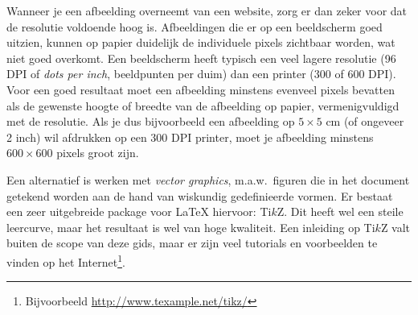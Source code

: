Wanneer je een afbeelding overneemt van een website, zorg er dan zeker voor dat de resolutie voldoende hoog is. Afbeeldingen die er op een beeldscherm goed uitzien, kunnen op papier duidelijk de individuele pixels zichtbaar worden, wat niet goed overkomt. Een beeldscherm heeft typisch een veel lagere resolutie (96 DPI of \emph{dots per inch}, beeldpunten per duim) dan een printer (300 of 600 DPI). Voor een goed resultaat moet een afbeelding minstens evenveel pixels bevatten als de gewenste hoogte of breedte van de afbeelding op papier, vermenigvuldigd met de resolutie. Als je dus bijvoorbeeld een afbeelding op $5 \times 5$ cm (of ongeveer 2 inch) wil afdrukken op een 300 DPI printer, moet je afbeelding minstens $600 \times 600$ pixels groot zijn.

Een alternatief is werken met \emph{vector graphics}, m.a.w.~figuren die in het document getekend worden aan de hand van wiskundig gedefinieerde vormen. Er bestaat een zeer uitgebreide package voor {\LaTeX} hiervoor: Ti$k$Z. Dit heeft wel een steile leercurve, maar het resultaat is wel van hoge kwaliteit. Een inleiding op Ti$k$Z valt buiten de scope van deze gids, maar er zijn veel tutorials en voorbeelden te vinden op het Internet\footnote{Bijvoorbeeld \url{http://www.texample.net/tikz/}}.


%

%
%
%
